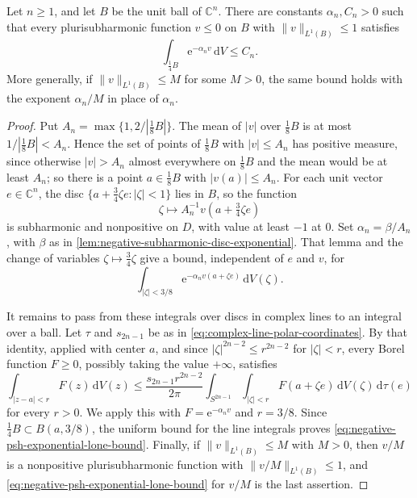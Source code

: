 \begin{proposition}\label{prop:negative-psh-ball-exponential}
Let $n\geq1$, and let $B$ be the unit ball of $\mathbb C^n$. There are constants $\alpha_n,C_n>0$ such that every plurisubharmonic function $v\leq0$ on $B$ with $\|v\|_{L^1(B)}\leq1$ satisfies
\begin{equation}\label{eq:negative-psh-exponential-lone-bound}
 \int_{\frac14B}\mathrm e^{-\alpha_n v}\,\mathrm dV\leq C_n.
\end{equation}
More generally, if $\|v\|_{L^1(B)}\leq M$ for some $M>0$, the same bound holds with the exponent $\alpha_n/M$ in place of $\alpha_n$.
\end{proposition}
\begin{proof}
Put $A_n=\max\{1,2/|\frac18B|\}$. The mean of $|v|$ over $\frac18B$ is at most $1/|\frac18B|<A_n$. Hence the set of points of $\frac18B$ with $|v|\leq A_n$ has positive measure, since otherwise $|v|>A_n$ almost everywhere on $\frac18B$ and the mean would be at least $A_n$; so there is a point $a\in\frac18B$ with $|v(a)|\leq A_n$. For each unit vector $e\in\mathbb C^n$, the disc $\{a+\tfrac34\zeta e:|\zeta|<1\}$ lies in $B$, so the function
\[
 \zeta\longmapsto A_n^{-1}v(a+\tfrac34\zeta e)
\]
is subharmonic and nonpositive on $D$, with value at least $-1$ at $0$. Set $\alpha_n=\beta/A_n$, with $\beta$ as in \cref{lem:negative-subharmonic-disc-exponential}. That lemma and the change of variables $\zeta\mapsto\frac34\zeta$ give a bound, independent of $e$ and $v$, for
\[
 \int_{|\zeta|<3/8}\mathrm e^{-\alpha_n v(a+\zeta e)}\,\mathrm dV(\zeta).
\]

It remains to pass from these integrals over discs in complex lines to an integral over a ball. Let $\tau$ and $s_{2n-1}$ be as in \eqref{eq:complex-line-polar-coordinates}. By that identity, applied with center $a$, and since $|\zeta|^{2n-2}\leq r^{2n-2}$ for $|\zeta|<r$, every Borel function $F\geq0$, possibly taking the value $+\infty$, satisfies
\[
 \int_{|z-a|<r}F(z)\,\mathrm dV(z)
 \leq\frac{s_{2n-1}r^{2n-2}}{2\pi}
       \int_{S^{2n-1}}\int_{|\zeta|<r}F(a+\zeta e)\,\mathrm dV(\zeta)\,\mathrm d\tau(e)
\]
for every $r>0$. We apply this with $F=\mathrm e^{-\alpha_n v}$ and $r=3/8$. Since $\frac14B\subset B(a,3/8)$, the uniform bound for the line integrals proves \eqref{eq:negative-psh-exponential-lone-bound}. Finally, if $\|v\|_{L^1(B)}\leq M$ with $M>0$, then $v/M$ is a nonpositive plurisubharmonic function with $\|v/M\|_{L^1(B)}\leq1$, and \eqref{eq:negative-psh-exponential-lone-bound} for $v/M$ is the last assertion.
\end{proof}

